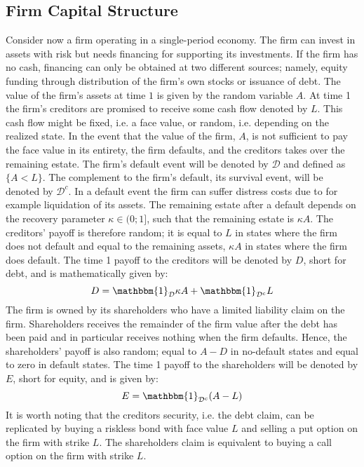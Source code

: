 \documentclass[main.tex]{subfiles}
\begin{document}
    \subsection{Firm Capital Structure}
        Consider now a firm operating in a single-period economy.
        The firm can invest in assets with risk but needs financing for supporting its investments.
        If the firm has no cash, financing can only be obtained at two different sources;
        namely, equity funding through distribution of the firm's own stocks or issuance of debt.
        The value of the firm's assets at time $1$ is given by the random variable $A$.
        At time 1 the firm's creditors are promised to receive some cash flow denoted by $L$.
        This cash flow might be fixed, i.e. a face value, 
        or random, i.e. depending on the realized state.
        In the event that the value of the firm, $A$, is not sufficient to pay the face value in its entirety, 
        the firm defaults, and the creditors takes over the remaining estate. 
        The firm's default event will be denoted by $\mathcal{D}$ and defined as $\{A < L\}$.
        The complement to the firm's default, its survival event, 
        will be denoted by $\mathcal{D}^{c}$.
        In a default event the firm can suffer distress costs due to for example liquidation of its assets.
        The remaining estate after a default depends on the recovery parameter $\kappa \in (0;1]$, such that the remaining estate is $\kappa A$.
        The creditors' payoff is therefore random; 
        it is equal to $L$ in states where the firm does not default
        and equal to the remaining assets, $\kappa A$ in states where the firm does default.
        The time 1 payoff to the creditors will be denoted by $D$, short for debt,
        and is mathematically given by:
            \begin{equation}
                D
                =
                \mathbbm{1}_{\mathcal{D}} \kappa A
                +
                \mathbbm{1}_{\mathcal{D}^{c}} L
            \end{equation}
        The firm is owned by its shareholders who have a limited liability claim on the firm.
        Shareholders receives the remainder of the firm value after the debt has been paid and in particular receives nothing when the firm defaults.
        Hence, the shareholders' payoff is also random;
        equal to $A - D$ in no-default states and equal to zero in default states.
        The time 1 payoff to the shareholders will be denoted by $E$, short for equity,
        and is given by:
            \begin{equation}
                E
                =
                \mathbbm{1}_{\mathcal{D}^{c}} 
                (A - L)
            \end{equation}
        It is worth noting that the creditors security, i.e. the debt claim, can be replicated by buying a riskless bond with face value $L$ and selling a put option on the firm with strike $L$.
        The shareholders claim is equivalent to buying a call option on the firm with strike $L$.
\end{document}
